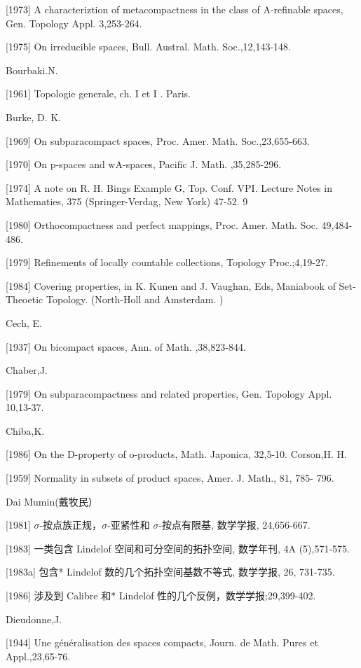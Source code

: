 \documentclass[main.tex]{subfiles}
\begin{document}
[1973] A characteriztion of metacompactness in the class of A-refinable
spaces, Gen. Topology Appl. 3,253-264.

[1975] On irreducible spaces, Bull. Austral. Math. Soc.,12,143-148.

\noindent Bourbaki.N.

[1961] Topologie generale, ch. I et I . Paris.


\noindent Burke, D. K.

[1969] On subparacompact spaces, Proc. Amer. Math. Soc.,23,655-663.

[1970] On p-spaces and wA-spaces, Pacific J. Math. ,35,285-296.

[1974] A note on R. H. Bings Example G, Top. Conf. VPI. Lecture Notes in
Mathematies, 375 (Springer-Verdag, New York) 47-52. 9

[1980] Orthocompactness and perfect mappings, Proc. Amer. Math. Soc.
49,484-486.

[1979] Refinements of locally countable collections, Topology Proc.;4,19-27.

[1984] Covering properties, in  K. Kunen and J. Vaughan, Eds, Maniabook of Set-Theoetic Topology. (North-Holl and Amsterdam. )


\noindent Cech, E.

[1937] On bicompact spaces, Ann. of Math. ,38,823-844.

\noindent Chaber,J.

[1979] On subparacompactness and related properties, Gen. Topology Appl.
10,13-37.

\noindent Chiba,K.

[1986] On the D-property of o-products, Math. Japonica, 32,5-10.
Corson,H. H.

[1959] Normality in subsets of product spaces, Amer. J. Math., 81, 785-
796.

\noindent Dai Mumin(戴牧民）

[1981] $\sigma$-按点族正规，$\sigma$-亚紧性和 $\sigma$-按点有限基, 数学学报, 24,656-667.

[1983] 一类包含 Lindelof 空间和可分空间的拓扑空间, 数学年刊, 4A
(5),571-575.

[1983a] 包含* Lindelof 数的几个拓扑空间基数不等式, 数学学报, 26, 731-735.

[1986] 涉及到 Calibre 和* Lindelof 性的几个反例，数学学报;29,399-402.
	
\noindent Dieudonne,J.

[1944] Une généralisation des spaces compacts, Journ. de Math. Pures et Appl.,23,65-76.
\end{document}

